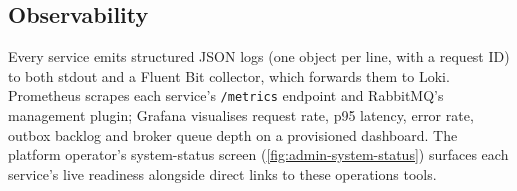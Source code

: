 \subsection{Observability}
Every service emits structured JSON logs (one object per line, with a
request ID) to both stdout and a Fluent Bit collector, which forwards them to
Loki. Prometheus scrapes each service's \texttt{/metrics} endpoint and
RabbitMQ's management plugin; Grafana visualises request rate, p95 latency,
error rate, outbox backlog and broker queue depth on a provisioned dashboard.
The platform operator's system-status screen (\cref{fig:admin-system-status})
surfaces each service's live readiness alongside direct links to these
operations tools.

